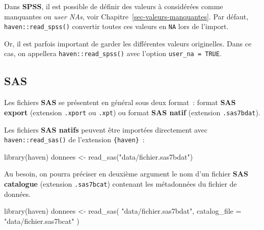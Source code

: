 \documentclass[
  letterpaper,
  DIV=11,
  numbers=noendperiod,
  oneside]{scrreprt}
\newenvironment{Shaded}{\begin{snugshade}}{\end{snugshade}}
\newcommand{\AttributeTok}[1]{\textcolor[rgb]{0.40,0.45,0.13}{#1}}
\newcommand{\FunctionTok}[1]{\textcolor[rgb]{0.28,0.35,0.67}{#1}}
\newcommand{\NormalTok}[1]{\textcolor[rgb]{0.00,0.23,0.31}{#1}}
\newcommand{\OtherTok}[1]{\textcolor[rgb]{0.00,0.23,0.31}{#1}}
\newcommand{\StringTok}[1]{\textcolor[rgb]{0.13,0.47,0.30}{#1}}
\begin{document}
\begin{tcolorbox}[enhanced jigsaw, colbacktitle=quarto-callout-tip-color!10!white, opacityback=0, toprule=.15mm, colback=white, coltitle=black, bottomtitle=1mm, toptitle=1mm, titlerule=0mm, rightrule=.15mm, title=\textcolor{quarto-callout-tip-color}{\faLightbulb}\hspace{0.5em}{Valeurs manquantes}, breakable, bottomrule=.15mm, opacitybacktitle=0.6, arc=.35mm, left=2mm, leftrule=.75mm, colframe=quarto-callout-tip-color-frame]

Dans \textbf{SPSS}, il est possible de définir des valeurs à considérées
comme manquantes ou \emph{user NAs}, voir
Chapitre~\ref{sec-valeurs-manquantes}. Par défaut,
\texttt{haven::read\_spss()} convertir toutes ces valeurs en \texttt{NA}
lors de l'import.

Or, il est parfois important de garder les différentes valeurs
originelles. Dans ce cas, on appellera \texttt{haven::read\_spss()} avec
l'option \texttt{user\_na\ =\ TRUE}.

\end{tcolorbox}

\hypertarget{sas}{%
\subsection{SAS}\label{sas}}

Les fichiers \textbf{SAS} se présentent en général sous deux format~:
format \textbf{SAS export} (extension \texttt{.xport} ou \texttt{.xpt})
ou format \textbf{SAS natif} (extension \texttt{.sas7bdat}).

Les fichiers \textbf{SAS natifs} peuvent être importées directement avec
\texttt{haven::read\_sas()} de l'extension \texttt{\{haven\}}~:

\begin{Shaded}
\begin{Highlighting}[]
\FunctionTok{library}\NormalTok{(haven)}
\NormalTok{donnees }\OtherTok{\textless{}{-}} \FunctionTok{read\_sas}\NormalTok{(}\StringTok{"data/fichier.sas7bdat"}\NormalTok{)}
\end{Highlighting}
\end{Shaded}

Au besoin, on pourra préciser en deuxième argument le nom d'un fichier
\textbf{SAS catalogue} (extension \texttt{.sas7bcat}) contenant les
métadonnées du fichier de données.

\begin{Shaded}
\begin{Highlighting}[]
\FunctionTok{library}\NormalTok{(haven)}
\NormalTok{donnees }\OtherTok{\textless{}{-}} \FunctionTok{read\_sas}\NormalTok{(}
  \StringTok{"data/fichier.sas7bdat"}\NormalTok{, }
  \AttributeTok{catalog\_file =} \StringTok{"data/fichier.sas7bcat"}
\NormalTok{)}
\end{Highlighting}
\end{Shaded}
\end{document}
